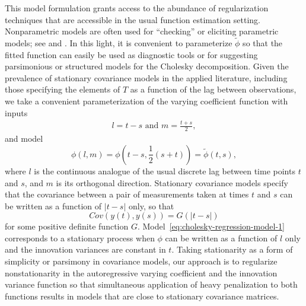 \bigskip

This model formulation grants access to the abundance of regularization techniques that are accessible in the usual function estimation setting. Nonparametric models are often used for ``checking'' or eliciting parametric models; see \cite{cox1988testing} and \cite{liu2004hypothesis}. In this light, it is convenient to parameterize $\tilde{\phi}$ so that the fitted function can easily be used as diagnostic tools or for suggesting parsimonious or structured models for the Cholesky decomposition. Given the prevalence of stationary covariance models in the applied literature, including those specifying the elements of $T$ as a function of the lag between observations, we take a convenient parameterization of the varying coefficient function with inputs
\begin{align}\label{eq:l-m-transformation}
l = t - s \mbox{ and } m = \frac{t + s}{2}, 
\end{align}
\noindent
and model 
\begin{equation} \label{eq:phi-to-tilde-phi} 
\phi\left(l,m\right) = {\phi}\left(t-s, \frac{1}{2}\left(s+t\right)\right) = \tilde{\phi}\left(t,s\right),
\end{equation}
\noindent
where $l$ is the continuous analogue of the usual discrete lag between time points $t$ and $s$, and $m$ is its orthogonal direction. Stationary covariance models specify that the covariance between a pair of measurements taken at times $t$ and $s$ can be written as a function of $\vert t - s\vert $ only, so that
\begin{equation*}
Cov\left(y\left( t \right),y\left( s \right)\right) = G\left( \vert t - s\vert  \right)
\end{equation*}
\noindent
for some positive definite function $G$. Model~\eqref{eq:cholesky-regression-model-1} corresponds to a stationary process when $\phi$ can be written as a function of $l$ only and the innovation variances are constant in $t$. Taking stationarity as a form of simplicity or parsimony in covariance models, our approach is to regularize nonstationarity in the autoregressive varying coefficient and the innovation variance function so that simultaneous application of heavy penalization to both functions results in models that are close to stationary covariance matrices.%


